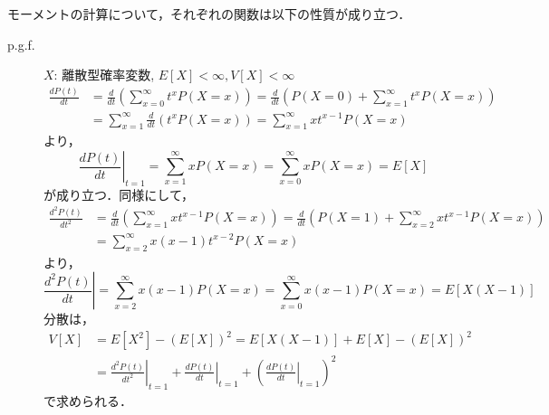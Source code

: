 \documentclass{jsreport}
\begin{document}
モーメントの計算について，それぞれの関数は以下の性質が成り立つ．
\begin{description}
  \item[p.g.f.]
  $X$: 離散型確率変数, $E[X] < \infty, V[X] < \infty$
  \begin{align}
    \frac{dP(t)}{dt} &= \frac{d}{dt} \left(\sum_{x = 0}^{\infty} t^x P(X = x) \right) = \frac{d}{dt} \left(P(X = 0) + \sum_{x=1}^{\infty} t^x P(X = x)\right) \nonumber \\
    &= \sum_{x=1}^{\infty} \frac{d}{dt} (t^x P(X = x)) = \sum_{x = 1}^{\infty} x t^{x - 1} P(X = x) \nonumber
  \end{align}
  より，
  \begin{equation}
    \left.\frac{dP(t)}{dt}\right|_{t = 1} = \sum_{x = 1}^{\infty} xP(X = x) = \sum_{x = 0}^{\infty} xP(X = x) = E[X] \nonumber
  \end{equation}
  が成り立つ．同様にして，
  \begin{align}
    \frac{d^2P(t)}{dt^2} &= \frac{d}{dt} \left(\sum_{x = 1}^{\infty} x t^{x - 1} P(X = x)\right) = \frac{d}{dt} \left(P(X = 1) + \sum_{x = 2}^{\infty} xt^{x - 1} P(X = x)\right) \nonumber \\
    &= \sum_{x = 2}^{\infty} x(x - 1)t^{x - 2} P(X = x) \nonumber
  \end{align}
  より，
  \begin{equation}
    \left.\frac{d^2P(t)}{dt}\right| = \sum_{x = 2}^{\infty} x(x - 1)P(X = x) = \sum_{x = 0}^{\infty} x(x - 1)P(X = x) = E[X(X - 1)] \nonumber
  \end{equation}
  分散は，
  \begin{align}
    V[X] &= E[X^2] - (E[X])^2 = E[X(X - 1)] + E[X] - (E[X])^2 \nonumber \\
    &= \left.\frac{d^2 P(t)}{dt^2}\right|_{t = 1} + \left.\frac{d P(t)}{dt}\right|_{t = 1} + \left(\left.\frac{d P(t)}{dt}\right|_{t = 1}\right)^2 \nonumber
  \end{align}
  で求められる．


\end{description}
\end{document}
